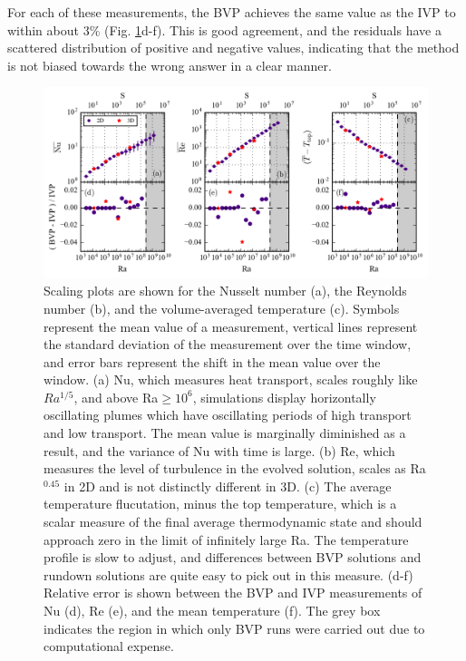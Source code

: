 \documentclass[aps, pre, onecolumn, nofootinbib, notitlepage, groupedaddress, amsfonts, amssymb, amsmath, longbibliography]{revtex4-1}
\begin{document}
For each of these measurements, the BVP achieves the same value as the IVP to
within about 3\% (Fig. \ref{fig:parameter_space_comparison}d-f).  This is good agreement,
and the residuals have a scattered distribution of positive and negative values, indicating
that the method is not biased towards the wrong answer in a clear manner.

\begin{figure}[t]
\includegraphics[width=\textwidth]{./figs/parameter_space_comparison.png}
\caption{Scaling plots are shown for the Nusselt number (a), the
Reynolds number (b), and the volume-averaged temperature (c).  
Symbols represent the mean value of
a measurement, vertical lines represent the standard deviation of the measurement over the
time window, and error bars represent the shift in the mean value over the window.
(a) Nu, which measures heat transport, scales roughly like $Ra^{1/5}$, and above Ra$\geq 10^6$,
simulations display horizontally oscillating plumes which have oscillating periods of high transport
and low transport.  The mean value is marginally diminished as a result, and the variance of Nu with time
is large. (b) Re, which measures the level of turbulence in the evolved solution, scales as
Ra$^{0.45}$ in 2D and is not distinctly different in 3D. (c) The average temperature flucutation, minus the top
temperature, which is a scalar measure of the final average thermodynamic state and should approach zero
in the limit of infinitely large Ra.
The temperature profile is slow to adjust, and differences between
BVP solutions and rundown solutions are quite easy to pick out in this measure. (d-f)
Relative error is shown between the BVP and IVP measurements of Nu (d), Re (e), and the
mean temperature (f). The grey box indicates the region in which only BVP runs were
carried out due to computational expense.
\label{fig:parameter_space_comparison} }
\end{figure}
\end{document}
